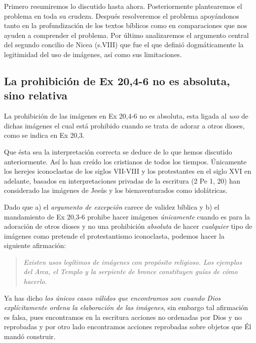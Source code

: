 \documentclass{article}
\begin{document}
Primero resumiremos lo discutido hasta ahora. Posteriormente plantearemos el problema en toda su crudeza. Despu\'es resolveremos el problema apoy\'andonos tanto en la profundizaci\'on de los textos b\'{i}blicos como en comparaciones que nos ayuden a comprender el problema. Por \'ultimo analizaremos el argumento central del segundo concilio de Nicea (s.VIII) que fue el que defini\'o dogm\'aticamente la legitimidad del uso de im\'agenes, as\'{i} como sus limitaciones.

\subsection{La prohibici\'on de Ex 20,4-6 no es absoluta, sino relativa}

La prohibici\'on de las im\'agenes en Ex 20,4-6 no es absoluta, esta ligada al \emph{uso} de dichas im\'agenes el cual est\'a prohibido cuando se trata de adorar a otros dioses, como se indica en Ex 20,3.

Que \'esta sea la interpretaci\'on correcta se deduce de lo que hemos discutido anteriormente. As\'{i} lo han cre\'{i}do los cristianos de todos los tiempos. \'Unicamente los herejes iconoclastas de los siglos VII-VIII y los protestantes en el siglo XVI en adelante, basados en interpretaciones privadas de la escritura (2 Pe 1, 20) han considerado las im\'agenes de Jes\'us y los bienaventurados como idol\'atricas.

Dado que a) el \emph{argumento de excepci\'on} carece de validez b\'{i}blica y b) el mandamiento de Ex 20,3-6 prohibe hacer im\'agenes \emph{\'unicamente} cuando es para la adoraci\'on de otros dioses y no una prohibici\'on \emph{absoluta} de hacer \emph{cualquier} tipo de im\'agenes como pretende el protestantismo iconoclasta, podemos hacer la siguiente afirmaci\'on:

\begin{quote}
\emph{Existen usos leg\'itimos de im\'agenes con prop\'osito religioso. Los ejemplos del Arca, el Templo y la serpiente de bronce constituyen gu\'{i}as de c\'omo hacerlo.}
\end{quote}

\noindent
Ya has dicho \emph{los \'unicos casos v\'alidos que encontramos son cuando Dios expl\'{i}citamente ordena la elaboraci\'on de las im\'agenes}, sin embargo tal afirmaci\'on es falsa, pues encontramos en la escritura acciones no ordenadas por Dios y no reprobadas y por otro lado encontramos acciones reprobadas sobre objetos que \'El mand\'o construir.
\end{document}
